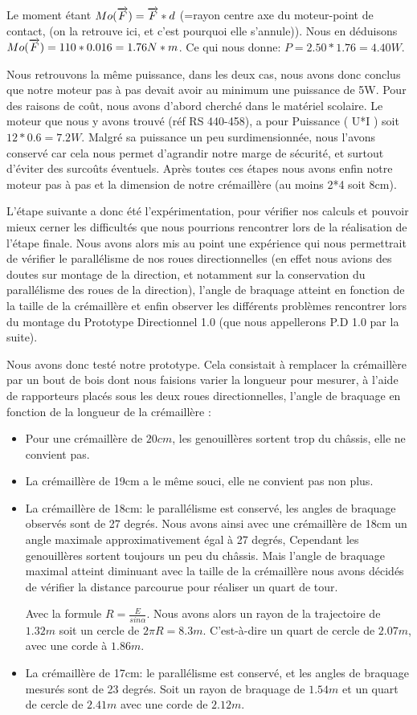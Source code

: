 Le moment étant $Mo(\overrightarrow{F}) = \overrightarrow{F}*d$ (=rayon centre axe du moteur-point de contact, (on la retrouve ici, et c’est pourquoi elle s’annule)). Nous en déduisons $Mo(\overrightarrow{F}) = 110*0.016 = 1.76 N*m$. Ce qui nous donne: $P = 2.50 * 1.76 = 4.40  W$.

Nous retrouvons la même puissance, dans les deux cas, nous avons donc conclus que notre moteur pas à pas devait avoir au minimum une puissance de 5W. Pour des raisons de coût, nous avons d’abord cherché dans le matériel scolaire. Le moteur que nous y avons trouvé (réf RS 440-458), a pour Puissance ( U*I ) soit $12*0.6 = 7.2W$. 
Malgré sa puissance un peu surdimensionnée, nous l’avons conservé car cela nous permet d’agrandir notre marge de sécurité, et surtout d’éviter des surcoûts éventuels.
Après toutes ces étapes nous avons enfin notre moteur pas à pas et la dimension de notre crémaillère (au moins 2*4 soit 8cm). 

L’étape suivante a donc été l’expérimentation, pour vérifier nos calculs et pouvoir mieux cerner les difficultés que nous pourrions rencontrer lors de la réalisation de l’étape finale.
Nous avons alors mis au point une expérience qui nous permettrait de vérifier le parallélisme de nos roues directionnelles (en effet nous avions des doutes sur montage de la direction, et notamment  sur la conservation du parallélisme des roues de la direction), l’angle de braquage atteint en fonction de la taille de la crémaillère et enfin observer les différents problèmes rencontrer lors du montage du Prototype Directionnel 1.0 (que nous appellerons P.D 1.0 par la suite).

Nous avons donc testé notre prototype. Cela consistait à remplacer la crémaillère par un bout de bois dont nous faisions varier la longueur pour mesurer, à l’aide de rapporteurs placés sous les deux roues directionnelles, l’angle de braquage en fonction de la longueur de la crémaillère : \begin{itemize}
    \item Pour une crémaillère de $20cm$, les genouillères sortent trop du châssis, elle ne convient pas.
    \item La crémaillère de 19cm a le même souci, elle ne convient pas non plus.
    \item La crémaillère de 18cm: le parallélisme est conservé, les angles de braquage observés sont de 27 degrés. Nous avons ainsi avec une crémaillère de 18cm un angle maximale approximativement égal à 27 degrés, Cependant les genouillères sortent toujours un peu du châssis. Mais l’angle de braquage maximal atteint diminuant avec la taille de la crémaillère nous avons décidés de vérifier la distance parcourue  pour réaliser un quart de tour.

        Avec la formule $R= \frac{E}{sin \alpha}$. Nous avons alors un rayon de la trajectoire de $1.32m$ soit un cercle de $2\pi R = 8.3m$. C’est-à-dire un quart de cercle de $2.07m$, avec une corde à $1.86m$.
    \item La crémaillère de 17cm: le parallélisme est conservé, et les angles de braquage mesurés sont de 23 degrés.
Soit un rayon de braquage de $1.54m$ et un quart de cercle de $2.41m$ avec une corde de $2.12m$.
\end{itemize}

